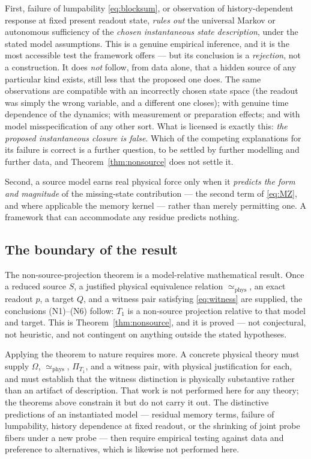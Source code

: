 \documentclass[11pt,reqno]{amsart}
\theoremstyle{plain}
\theoremstyle{definition}
\theoremstyle{remark}
\begin{document}
First, failure of lumpability \eqref{eq:blocksum}, or observation of history-dependent response at fixed present readout state, \emph{rules out} the universal Markov or autonomous sufficiency of the \emph{chosen instantaneous state description}, under the stated model assumptions. This is a genuine empirical inference, and it is the most accessible test the framework offers --- but its conclusion is a \emph{rejection}, not a construction. It does \emph{not} follow, from data alone, that a hidden source of any particular kind exists, still less that the proposed one does. The same observations are compatible with an incorrectly chosen state space (the readout was simply the wrong variable, and a different one closes); with genuine time dependence of the dynamics; with measurement or preparation effects; and with model misspecification of any other sort. What is licensed is exactly this: \emph{the proposed instantaneous closure is false}. Which of the competing explanations for its failure is correct is a further question, to be settled by further modelling and further data, and Theorem~\ref{thm:nonsource} does not settle it.

Second, a source model earns real physical force only when it \emph{predicts the form and magnitude} of the missing-state contribution --- the second term of \eqref{eq:MZ}, and where applicable the memory kernel --- rather than merely permitting one. A framework that can accommodate any residue predicts nothing.

\subsection{The boundary of the result}\label{subsec:boundary}

The non-source-projection theorem is a model-relative mathematical result. Once a reduced source $S$, a justified physical equivalence relation $\simeq_{\mathrm{phys}}$, an exact readout $p$, a target $Q$, and a witness pair satisfying \eqref{eq:witness} are supplied, the conclusions (N1)--(N6) follow: $T_1$ is a non-source projection relative to that model and target. This is Theorem~\ref{thm:nonsource}, and it is proved --- not conjectural, not heuristic, and not contingent on anything outside the stated hypotheses.

Applying the theorem to nature requires more. A concrete physical theory must supply $\Omega$, $\simeq_{\mathrm{phys}}$, $\Pi_{T_1}$, and a witness pair, with physical justification for each, and must establish that the witness distinction is physically substantive rather than an artifact of description. That work is not performed here for any theory; the theorems above constrain it but do not carry it out. The distinctive predictions of an instantiated model --- residual memory terms, failure of lumpability, history dependence at fixed readout, or the shrinking of joint probe fibers under a new probe --- then require empirical testing against data and preference to alternatives, which is likewise not performed here.
\end{document}
